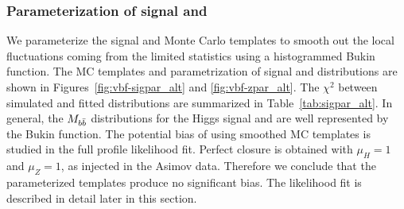 \subsubsection{Parameterization of signal and \zjets{}}



We parameterize the signal and \zjets{} Monte Carlo templates to smooth out the local fluctuations coming from the limited statistics using a histogrammed Bukin function. The MC templates and parametrization of signal and \zjets{} \Mbb{} distributions are shown in Figures~\ref{fig:vbf-sigpar_alt} and \ref{fig:vbf-zpar_alt}. The $\chi^2$ between simulated and fitted distributions are summarized in Table~\ref{tab:sigpar_alt}. In general, the $M_{b\bar{b}}$ distributions for the Higgs signal and \zjets{} are well represented by the Bukin function. The potential bias of using smoothed MC templates is studied in the full profile likelihood fit. Perfect closure is obtained with $\mu_{H}=1$ and $\mu_{Z}=1$, as injected in the Asimov data.  Therefore we conclude that the parameterized templates produce no significant bias.  The likelihood fit is described in detail later in this section.

